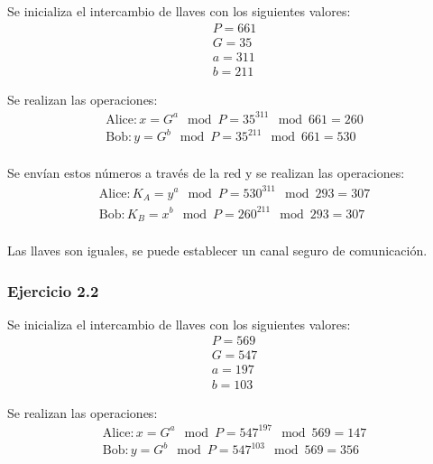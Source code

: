 \documentclass{article}
\begin{document}
                Se inicializa el intercambio de llaves con los siguientes valores:
                \begin{gather*}
                    P = 661 \\
                    G = 35 \\
                    a = 311 \\
                    b = 211
                \end{gather*}

                Se realizan las operaciones:
                \begin{gather*}
                    \text{Alice}: x = G^{a} \mod{P} = 35^{311} \mod{661} = 260 \\
                    \text{Bob}: y = G^{b} \mod{P} = 35^{211} \mod{661} = 530 \\
                \end{gather*}

                Se envían estos números a través de la red y se realizan las operaciones:
                \begin{gather*}
                    \text{Alice}: K_A = y^{a} \mod{P} = 530^{311} \mod{293} = 307 \\
                    \text{Bob}: K_B = x^{b} \mod{P} = 260^{211} \mod{293} = 307 \\
                \end{gather*}

                Las llaves son iguales, se puede establecer un canal seguro de comunicación.

            \subsubsection*{Ejercicio 2.2}

                Se inicializa el intercambio de llaves con los siguientes valores:
                \begin{gather*}
                    P = 569 \\
                    G = 547 \\
                    a = 197 \\
                    b = 103
                \end{gather*}

                Se realizan las operaciones:
                \begin{gather*}
                    \text{Alice}: x = G^{a} \mod{P} = 547^{197} \mod{569} = 147 \\
                    \text{Bob}: y = G^{b} \mod{P} = 547^{103} \mod{569} = 356 \\
                \end{gather*}
\end{document}
